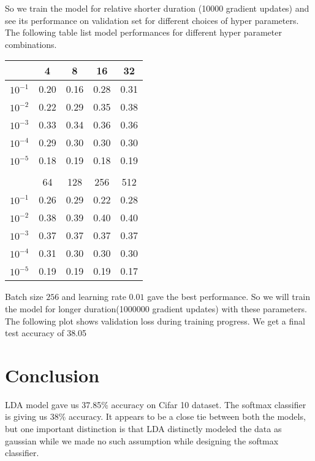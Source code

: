 \documentclass[12pt,crop=false,class=article,convert={density=300,outext=.compiled.png}]{standalone}
\begin{document}
So we train the model for relative shorter duration (10000 gradient
updates) and see its performance on validation set for different choices
of hyper parameters. The following table list model performances for
different hyper parameter combinations.
\begin{center}
\begin{tabular}{l|cccc|}                                                      
                &4    &  8    &  16   &  32   \\      \hline      
  $10^{-1}$     &0.20 &  0.16 &  0.28 &  0.31 \\            
  $10^{-2   }$  &0.22 &  0.29 &  0.35 &  0.38 \\            
  $10^{-3  }$   &0.33 &  0.34 &  0.36 &  0.36 \\            
  $10^{-4 }$    &0.29 &  0.30 &  0.30 &  0.30 \\            
  $10^{-5}$     &0.18 &  0.19 &  0.18 &  0.19 \\            
                &     &       &       &       \\            
                &64   &  128  &  256  &  512  \\  \hline          
  $10^{-1}$     &0.26 &  0.29 &  0.22 &  0.28 \\            
  $10^{-2   }$  &0.38 &  0.39 &  0.40 &  0.40 \\            
  $10^{-3  }$   &0.37 &  0.37 &  0.37 &  0.37 \\            
  $10^{-4 }$    &0.31 &  0.30 &  0.30 &  0.30 \\            
  $10^{-5}$     &0.19 &  0.19 &  0.19 &  0.17 \\    
\end{tabular}        
\end{center}

Batch size $256$ and learning rate $0.01$ gave the best performance. So
we will train the model for longer duration(1000000 gradient updates)
with these parameters. The following plot shows validation loss during
training progress. We get a final test accuracy of 38.05%

\section*{Conclusion}


LDA model gave us 37.85\% accuracy on Cifar 10 dataset. The softmax
classifier is giving us 38\% accuracy. It appears to be a close tie
between both the models, but one important distinction is that LDA
distinctly modeled the data as gaussian while we made no such
assumption while designing the softmax classifier.
\end{document}
